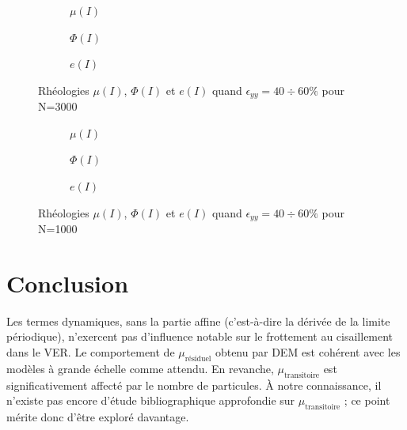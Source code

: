 \documentclass[5p,authoryear,square]{elsarticle}
\begin{document}
\begin{figure}[htbp]
    \centering
    \begin{subfigure}{0.9\linewidth}
        \centering
        \scalebox{0.5}{}
        \caption{$\mu(I)$}
        \label{3000_mu_I_fit}
    \end{subfigure}
    
    \begin{subfigure}{0.9\linewidth}
        \centering
        \scalebox{0.5}{}
        \caption{$\Phi(I)$}
        \label{3000_phi_I_fit}
    \end{subfigure}
    
    \begin{subfigure}{0.9\linewidth}
        \centering
        \scalebox{0.5}{}
        \caption{$e(I)$}
        \label{3000_e_I_fit}
    \end{subfigure}
    \caption{Rhéologies $\mu(I)$, $\Phi(I)$ et $e(I)$ quand $\epsilon_{yy} = 40 \div 60\%$ pour N=3000}
    \label{rheologies_3000}
\end{figure}


\begin{figure}[htbp]
    \centering
    \begin{subfigure}{0.9\linewidth}
        \centering
        \scalebox{0.5}{}
        \caption{$\mu(I)$}
        \label{1000_mu_I_fit}
    \end{subfigure}
    
    \begin{subfigure}{0.9\linewidth}
        \centering
        \scalebox{0.5}{}
        \caption{$\Phi(I)$}
        \label{1000_phi_I_fit}
    \end{subfigure}
    
    \begin{subfigure}{0.9\linewidth}
        \centering
        \scalebox{0.5}{}
        \caption{$e(I)$}
        \label{1000_e_I_fit}
    \end{subfigure}
    \caption{Rhéologies $\mu(I)$, $\Phi(I)$ et $e(I)$ quand $\epsilon_{yy} = 40 \div 60\%$ pour N=1000}
    \label{rheologies_1000}
\end{figure}

\section{Conclusion}\label{discussion}

Les termes dynamiques, sans la partie affine (c'est-à-dire la dérivée de la limite périodique), n'exercent pas d'influence notable sur le frottement au cisaillement dans le VER.
Le comportement de $\mu_{\text{résiduel}}$ obtenu par DEM est cohérent avec les modèles à grande échelle comme attendu.
En revanche, $\mu_{\text{transitoire}}$ est significativement affecté par le nombre de particules.
À notre connaissance, il n'existe pas encore d'étude bibliographique approfondie sur $\mu_{\text{transitoire}}$ ; ce point mérite donc d'être exploré davantage.


\end{document}
